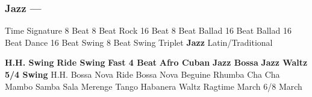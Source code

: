 \subsubsection[Jazz]{Jazz --- \UiKey{\II}\UiKey{\MET}}
Time Signature
8 Beat
8 Beat Rock
16 Beat
8 Beat Ballad
16 Beat Ballad
16 Beat Dance
16 Beat Swing
8 Beat Swing
Triplet
\textbf{Jazz}
Latin/Traditional





























\textbf{H.H. Swing}
\textbf{Ride Swing}
\textbf{Fast 4 Beat}
\textbf{Afro Cuban}
\textbf{Jazz Bossa}
\textbf{Jazz Waltz}
\textbf{5/4 Swing}
H.H. Bossa Nova
Ride Bossa Nova
Beguine
Rhumba
Cha Cha
Mambo
Samba
Sala
Merenge
Tango
Habanera
Waltz
Ragtime
March
6/8 March
